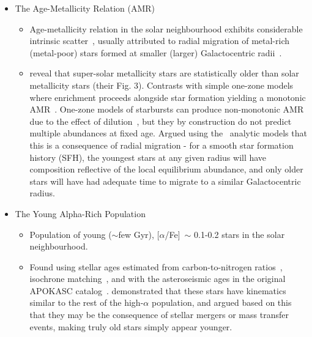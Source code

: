\documentclass[fleqn, usenatbib]{mnras}
\begin{document}
\begin{itemize}
	\item The Age-Metallicity Relation (AMR) 
	\begin{itemize} 
		\item Age-metallicity relation in the solar neighbourhood exhibits 
		considerable intrinsic scatter~\citep{Edvardsson1993}, usually 
		attributed to radial migration of metal-rich (metal-poor) stars formed 
		at smaller (larger) Galactocentric radii~\citep{Sellwood2002, 
		Haywood2008, Roskar2008b, Schoenrich2009}. 

		\item \citet{Feuillet2018} reveal that super-solar metallicity stars 
		are statistically older than solar metallicity stars (their Fig. 3). 
		Contrasts with simple one-zone models where enrichment proceeds 
		alongside star formation yielding a monotonic 
		AMR~\citep[e.g.][]{Andrews2017, Weinberg2017}. One-zone models of 
		starbursts can produce non-monotonic AMR due to the effect of 
		dilution~\citep{Johnson2020}, but they by construction do not predict 
		multiple abundances at fixed age. Argued using 
		the~\citet{Weinberg2017} 
		analytic models that this is a consequence of radial migration - for a 
		smooth star formation history (SFH), the youngest stars at any given 
		radius will have composition reflective of the local equilibrium 
		abundance, and only older stars will have had adequate time to 
		migrate to a similar Galactocentric radius. 
	\end{itemize}

	\item The Young Alpha-Rich Population 
	\begin{itemize} 
		\item Population of young ($\sim$few Gyr), [$\alpha$/Fe]~$\sim$ 
		0.1-0.2 stars in the solar neighbourhood. 

		\item Found using stellar ages estimated from carbon-to-nitrogen 
		ratios~\citep{Martig2016}, isochrone matching~\citep{Feuillet2018, 
		Feuillet2019}, and with the asteroseismic ages in the original APOKASC 
		catalog~\citep{Chiappini2015, SilvaAguirre2018, Pinsonneault2014}. 
		\citet{SilvaAguirre2018} demonstrated that these stars have 
		kinematics similar to the rest of the high-$\alpha$ population, and 
		argued based on this that they may be the consequence of stellar 
		mergers or mass transfer events, making truly old stars simply appear 
		younger. 


\end{itemize}
\end{itemize}
\end{document}
